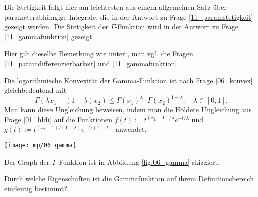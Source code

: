 \begin{antwort}
    \medskip
    \noindent
     Die Stetigkeit folgt hier am leichtesten aus einem allgemeinen 
    Satz über parameterabhängige Integrale, 
    die in der Antwort zu Frage \ref{11_paramstetigkeit} gezeigt werden. 
    Die Stetigkeit der $\Gamma$-Funktion wird in der Antwort zu 
    Frage \ref{11_gammafunktion} gezeigt.  

    \medskip
    \noindent
     Hier gilt dieselbe Bemerkung wie unter , man 
    vgl. die Fragen \ref{11_paramdifferenzierbarkeit} und 
    \ref{11_gammafunktion}

    \medskip
    \noindent
    Die logarithmische Konvexität der Gamma-Funktion 
    ist nach Frage \ref{06_konvex} gleichbedeutend mit
    \[
    \Gamma\left( \lambda x_1 + (1-\lambda) x_2 \right) \le 
    \Gamma( x_1 )^\lambda \cdot \Gamma( x_2 )^{1-\lambda}, \quad
    \lambda \in [0,1].
    \]
    Man kann diese Ungleichung beweisen, 
    indem man die Hölder\sch e Ungleichung 
    aus Frage \ref{01_hldi} auf die Funktionen 
    $f(t) := t^{(x_1-1)/\lambda}e^{-t/\lambda}$ und 
    $g(t) := t^{(x_2-1)/(1-\lambda)}e^{-t/(1-\lambda)}$ anwendet.

    \begin{center}
      \texttt{[image: mp/06\_gamma]}
      \label{fig:06_gamma}
    \end{center}

    Der Graph der $\Gamma$-Funktion ist in Abbildung \ref{fig:06_gamma} 
    skizziert.
  \end{antwort}

  \begin{frage}
    Durch welche Eigenschaften ist die Gammafunktion auf 
    ihrem Definitionsbereich eindeutig bestimmt?
  \end{frage}

